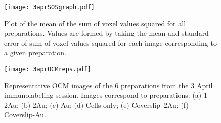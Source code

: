 \begin{figure}[htbp]
\centering
\texttt{[image: 3aprSOSgraph.pdf]}
\caption{Plot of the mean of the sum of voxel values squared for all preparations. Values are formed by taking the mean and standard error of sum of voxel values squared for each image corresponding to a given preparation.}
\label{aprsos}
\end{figure}



\begin{figure}[htbp]
\centering
\texttt{[image: 3aprOCMreps.pdf]}
\caption{Representative OCM images of the 6 preparations from the 3 April immunolabeling session. Images correspond to preparations: (a) 1--2Au; (b) 2Au; (c) Au; (d) Cells only; (e) Coverslip--2Au; (f) Coverslip-Au.}
\label{aprocmreps}
\end{figure}




